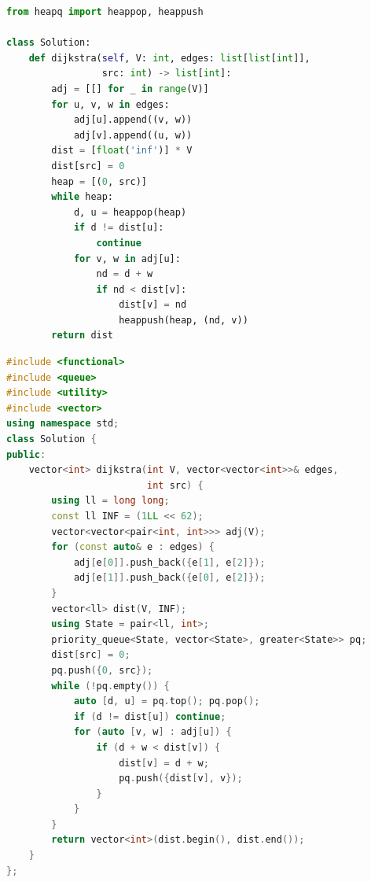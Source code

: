 \documentclass[11pt]{article}
\begin{document}
\begin{lstlisting}[language=Python,caption={P01 --- Python 3},label={lst:p01-python}]
from heapq import heappop, heappush

class Solution:
    def dijkstra(self, V: int, edges: list[list[int]],
                 src: int) -> list[int]:
        adj = [[] for _ in range(V)]
        for u, v, w in edges:
            adj[u].append((v, w))
            adj[v].append((u, w))
        dist = [float('inf')] * V
        dist[src] = 0
        heap = [(0, src)]
        while heap:
            d, u = heappop(heap)
            if d != dist[u]:
                continue
            for v, w in adj[u]:
                nd = d + w
                if nd < dist[v]:
                    dist[v] = nd
                    heappush(heap, (nd, v))
        return dist
\end{lstlisting}
\begin{lstlisting}[language=C++,caption={P01 --- C++17},label={lst:p01-cpp}]
#include <functional>
#include <queue>
#include <utility>
#include <vector>
using namespace std;
class Solution {
public:
    vector<int> dijkstra(int V, vector<vector<int>>& edges,
                         int src) {
        using ll = long long;
        const ll INF = (1LL << 62);
        vector<vector<pair<int, int>>> adj(V);
        for (const auto& e : edges) {
            adj[e[0]].push_back({e[1], e[2]});
            adj[e[1]].push_back({e[0], e[2]});
        }
        vector<ll> dist(V, INF);
        using State = pair<ll, int>;
        priority_queue<State, vector<State>, greater<State>> pq;
        dist[src] = 0;
        pq.push({0, src});
        while (!pq.empty()) {
            auto [d, u] = pq.top(); pq.pop();
            if (d != dist[u]) continue;
            for (auto [v, w] : adj[u]) {
                if (d + w < dist[v]) {
                    dist[v] = d + w;
                    pq.push({dist[v], v});
                }
            }
        }
        return vector<int>(dist.begin(), dist.end());
    }
};
\end{lstlisting}
\end{document}
